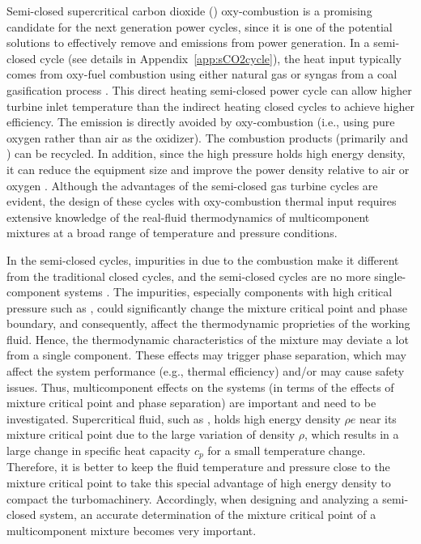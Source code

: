 Semi-closed supercritical carbon dioxide () oxy-combustion is a promising candidate for the next generation power cycles, since it is one of the potential solutions to effectively remove  and  emissions from power generation. 
In a semi-closed  cycle (see details in Appendix~\ref{app:sCO2cycle}), the heat input typically comes from oxy-fuel combustion using either natural gas or syngas from a coal gasification process \citep{mcclung2015comparison}. This direct heating semi-closed  power cycle can allow higher turbine inlet temperature than the indirect heating closed  cycles to achieve higher efficiency.
The  emission is directly avoided by oxy-combustion (i.e., using pure oxygen rather than air as the oxidizer). The combustion products (primarily  and ) can be recycled. 
In addition, since the high pressure  holds high energy density, it can reduce the equipment size and improve the power density relative to air or oxygen \citep{dostal2004supercritical,ahn2015review}. Although the advantages of the semi-closed  gas turbine cycles are evident, the design of these cycles with oxy-combustion thermal input requires extensive knowledge of the real-fluid thermodynamics of multicomponent mixtures at a broad range of temperature and pressure conditions.

In the semi-closed  cycles, impurities in  due to the combustion make it different from the traditional closed  cycles, and the semi-closed  cycles are no more single-component systems \cite{abdul2017cfd,barak2020ignition}. The impurities, especially components with high critical pressure such as , could significantly change the mixture critical point and phase boundary, and consequently, affect the thermodynamic proprieties of the working fluid. Hence, the thermodynamic characteristics of the mixture may deviate a lot from a single component. These effects may trigger phase separation, which may affect the system performance (e.g., thermal efficiency) and/or may cause safety issues. Thus, multicomponent effects on the  systems (in terms of the effects of mixture critical point and phase separation) are important and need to be investigated. Supercritical fluid, such as , holds high energy density $\rho e$ near its mixture critical point due to the large variation of density $\rho$, which results in a large change in specific heat capacity $c_p$ for a small temperature change. Therefore, it is better to keep the fluid temperature and pressure close to the mixture critical point to take this special advantage of high energy density to compact the turbomachinery. Accordingly, when designing and analyzing a semi-closed  system, an accurate determination of the mixture critical point of a multicomponent mixture becomes very important.

